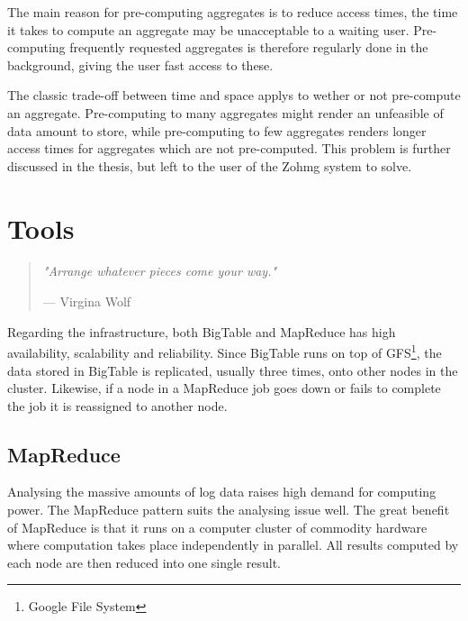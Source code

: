 \documentclass[a4paper,10pt]{book}
\newcommand{\chapterquote}[2] {
\begin{quote}
\textit{"{#1}"}

--- {#2}
\end{quote}

\vspace{24pt}
}
\begin{document}
The main reason for pre-computing aggregates is to reduce access times, the
time it takes to compute an aggregate may be unacceptable to a waiting
user. Pre-computing frequently requested aggregates is therefore regularly
done in the background, giving the user fast access to these.
\cite{olap_solutions}

The classic trade-off between time and space applys to wether or not
pre-compute an aggregate. Pre-computing to many aggregates might render an
unfeasible of data amount to store, while pre-computing to few aggregates
renders longer access times for aggregates which are not pre-computed. This
problem is further discussed in the thesis, but left to the user of the
Zohmg system to solve.



\chapter{Tools}

\chapterquote{Arrange whatever pieces come your way.}{Virgina Wolf}


Regarding the infrastructure, both BigTable and MapReduce has high
availability, scalability and reliability. Since BigTable runs on top of
GFS\footnote{Google File System}, the data stored in BigTable is
replicated, usually three times, onto other nodes in the cluster.
\cite{gfs} Likewise, if a node in a MapReduce job goes down or fails to
complete the job it is reassigned to another node. \cite{mapreduce}



\section{MapReduce}

Analysing the massive amounts of log data raises high demand for computing
power. The MapReduce \cite{mapreduce} pattern suits the analysing issue
well. The great benefit of MapReduce is that it runs on a computer cluster
of commodity hardware where computation takes place independently in
parallel. All results computed by each node are then reduced into one
single result.
\end{document}

